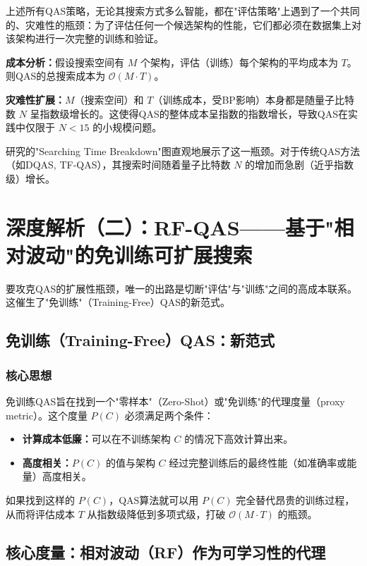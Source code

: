 \documentclass[12pt,a4paper]{article}
\begin{document}
上述所有QAS策略，无论其搜索方式多么智能，都在"评估策略"上遇到了一个共同的、灾难性的瓶颈：为了评估任何一个候选架构的性能，它们都必须在数据集上对该架构进行一次完整的训练和验证。

\textbf{成本分析：}假设搜索空间有 $M$ 个架构，评估（训练）每个架构的平均成本为 $T$。则QAS的总搜索成本为 $\mathcal{O}(M \cdot T)$。

\textbf{灾难性扩展：}$M$（搜索空间）和 $T$（训练成本，受BP影响）本身都是随量子比特数 $N$ 呈指数级增长的。这使得QAS的整体成本呈指数的指数增长，导致QAS在实践中仅限于 $N < 15$ 的小规模问题。

研究的"Searching Time Breakdown"图直观地展示了这一瓶颈。对于传统QAS方法（如DQAS, TF-QAS），其搜索时间随着量子比特数 $N$ 的增加而急剧（近乎指数级）增长。

\section{深度解析（二）：RF-QAS——基于"相对波动"的免训练可扩展搜索}

要攻克QAS的扩展性瓶颈，唯一的出路是切断"评估"与"训练"之间的高成本联系。这催生了"免训练"（Training-Free）QAS的新范式。

\subsection{免训练（Training-Free）QAS：新范式}

\subsubsection{核心思想}

免训练QAS旨在找到一个"零样本"（Zero-Shot）或"免训练"的代理度量（proxy metric）。这个度量 $P(C)$ 必须满足两个条件：
\begin{itemize}
\item \textbf{计算成本低廉：}可以在不训练架构 $C$ 的情况下高效计算出来。
\item \textbf{高度相关：}$P(C)$ 的值与架构 $C$ 经过完整训练后的最终性能（如准确率或能量）高度相关。
\end{itemize}

如果找到这样的 $P(C)$，QAS算法就可以用 $P(C)$ 完全替代昂贵的训练过程，从而将评估成本 $T$ 从指数级降低到多项式级，打破 $\mathcal{O}(M \cdot T)$ 的瓶颈。

\subsection{核心度量：相对波动（RF）作为可学习性的代理}
\end{document}
